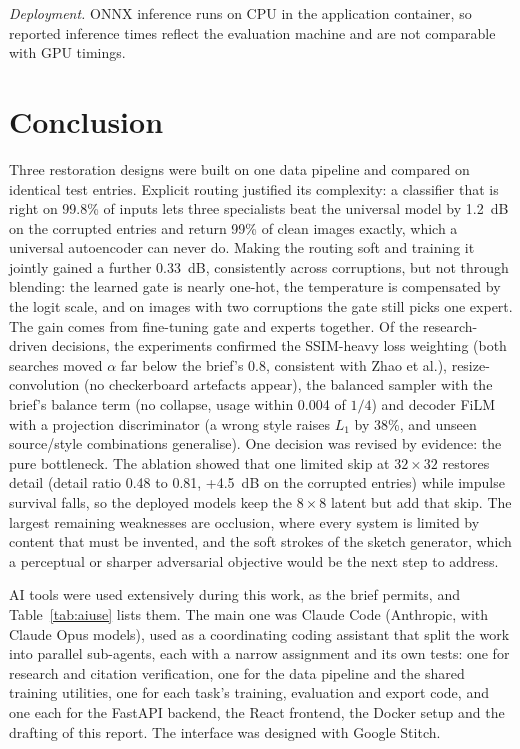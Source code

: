\documentclass[conference]{IEEEtran}
\begin{document}
\emph{Deployment.} ONNX inference runs on CPU in the application container, so
reported inference times reflect the evaluation machine and are not comparable
with GPU timings.

\section{Conclusion}

Three restoration designs were built on one data pipeline and compared on
identical test entries. Explicit routing justified its complexity: a classifier
that is right on 99.8\% of inputs lets three specialists beat the universal model
by 1.2~dB on the corrupted entries and return 99\% of clean images exactly, which a
universal autoencoder can never do. Making the routing soft and training it
jointly gained a further 0.33~dB, consistently across corruptions, but not through
blending: the learned gate is nearly one-hot, the temperature is compensated by
the logit scale, and on images with two corruptions the gate still picks one
expert. The gain comes from fine-tuning gate and experts together. Of the
research-driven decisions, the experiments confirmed the SSIM-heavy loss weighting
(both searches moved $\alpha$ far below the brief's 0.8, consistent with Zhao et
al.), resize-convolution (no checkerboard artefacts appear), the balanced sampler
with the brief's balance term (no collapse, usage within 0.004 of $1/4$) and decoder
FiLM with a projection discriminator (a wrong style raises $L_1$ by 38\%, and
unseen source/style combinations generalise). One decision was revised by
evidence: the pure bottleneck. The ablation showed that one limited skip at
$32\times32$ restores detail (detail ratio 0.48 to 0.81, +4.5~dB on the corrupted
entries) while impulse survival falls, so the deployed models keep the $8\times8$
latent but add that skip. The largest remaining weaknesses are occlusion, where
every system is limited by content that must be invented, and the soft strokes of
the sketch generator, which a perceptual or sharper adversarial objective would be
the next step to address.


AI tools were used extensively during this work, as the brief permits, and
Table~\ref{tab:aiuse} lists them. The main one was Claude Code (Anthropic, with
Claude Opus models), used as a coordinating coding assistant that split the work
into parallel sub-agents, each with a narrow assignment and its own tests: one
for research and citation verification, one for the data pipeline and the shared
training utilities, one for each task's training, evaluation and export code, and
one each for the FastAPI backend, the React frontend, the Docker setup and the
drafting of this report. The interface was designed with Google Stitch.
\end{document}
